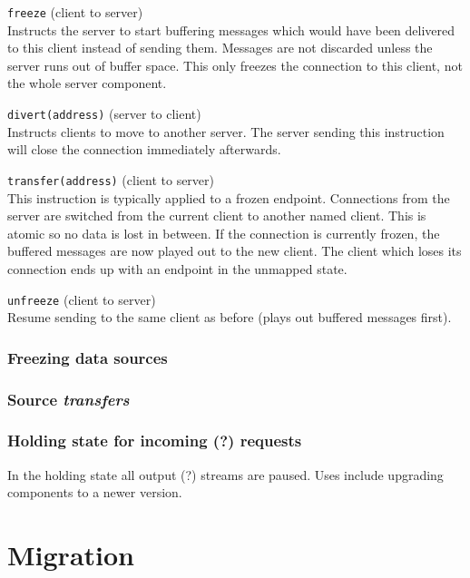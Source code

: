 \documentclass[12pt,a4paper,twoside]{article}
\renewcommand{\_}{\texttt{\symbol{95}}}
\begin{document}
\begin{bulletlist}
\item \verb^freeze^ (client to server)\\
	Instructs the server to start buffering messages which would have
	been delivered to this client instead of sending them. Messages
	are not discarded unless the server runs out of buffer space.
	This only freezes the connection to this client, not the whole
	server component.
\item \verb^divert(address)^ (server to client)\\
	Instructs clients to move to another server. The server
	sending this instruction will close the connection immediately afterwards.
\item \verb^transfer(address)^ (client to server)\\
	This instruction is typically applied to a frozen endpoint.
	Connections from the server are switched from the current client
	to another named client. This is atomic so no data is lost in between.
	If the connection is currently frozen, the buffered messages are
	now played out to the new client.
	The client which loses its connection ends up with an endpoint in
	the unmapped state.
\item \verb^unfreeze^ (client to server)\\
	Resume sending to the same client as before (plays out buffered
	messages first).
\end{bulletlist}

\subsubsection*{Freezing data sources}

\subsubsection*{Source \textit{transfers}}

\subsubsection*{Holding state for incoming (?) requests}

In the holding state all output (?) streams are paused. Uses include
upgrading components to a newer version.

\section{Migration}
\end{document}
